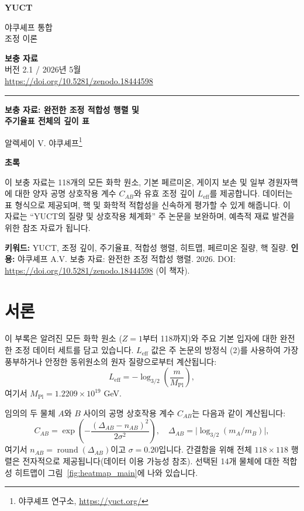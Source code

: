 \documentclass[12pt,a4paper]{article}
\newcommand{\makeheader}{%
	\noindent
	\begin{minipage}{0.17\textwidth}
		\raggedright
		{\sffamily\bfseries\color{skyblue}\fontsize{40}{40}\selectfont YUCT}%
	\end{minipage}%
	\hspace{30pt}
	\begin{minipage}{0.32\textwidth}
		\raggedright
		{\sffamily\fontsize{11}{13}\selectfont 야쿠셰프 통합\\ 조정 이론}%
	\end{minipage}%
	\hfill
	\begin{minipage}{0.38\textwidth}
		\raggedleft
		{\sffamily\bfseries 보충 자료}\\
		{\sffamily 버전 2.1 / 2026년 5월}\\
		{\sffamily\footnotesize \url{https://doi.org/10.5281/zenodo.18444598}}%
	\end{minipage}
	\par\vspace{5pt}
	\noindent\textcolor{gold}{\rule{\textwidth}{1.6pt}}
	\par\vspace{0pt}
}
\begin{document}
	\thispagestyle{firstpage}
	\makeheader
	
	\vspace{0cm}
	{\LARGE\bfseries 보충 자료: 완전한 조정 적합성 행렬 및 \\ 
		\Large 주기율표 전체의 깊이 표 \par}
	\vspace{0.2cm}
	
	{\large 알렉세이 V. 야쿠셰프\footnote{야쿠셰프 연구소, \url{https://yuct.org/}}} \\
	\vspace{0.0cm}
	
	{\color{darkblue}\textbf{\LARGE 초록}} \par
	{\large
		\noindent
		이 보충 자료는 118개의 모든 화학 원소, 기본 페르미온, 게이지 보손 및 일부 경원자핵에 대한 양자 공명 상호작용 계수 \(C_{AB}\)와 유효 조정 깊이 \(L_{\mathrm{eff}}\)를 제공합니다. 데이터는 표 형식으로 제공되며, 핵 및 화학적 적합성을 신속하게 평가할 수 있게 해줍니다. 이 자료는 ``YUCT의 질량 및 상호작용 체계화'' 주 논문을 보완하며, 예측적 재료 발견을 위한 참조 자료가 됩니다.
	}
	
	\vspace{0.1cm}
	\noindent
	{\color{darkblue}\textbf{키워드:}} YUCT, 조정 깊이, 주기율표, 적합성 행렬, 히트맵, 페르미온 질량, 핵 질량.
	\vspace{0.1cm}
	\noindent
	{\color{darkblue}\textbf{인용:}} 야쿠셰프 A.V. 보충 자료: 완전한 조정 적합성 행렬. 2026. DOI: \url{https://doi.org/10.5281/zenodo.18444598} (이 책자).
	
	\vspace{0.4cm}
	
	\noindent
	\begin{minipage}[t]{0.48\textwidth}
		\section*{서론}
		이 부록은 알려진 모든 화학 원소 (\(Z = 1\)부터 118까지)와 주요 기본 입자에 대한 완전한 조정 데이터 세트를 담고 있습니다. \(L_{\mathrm{eff}}\) 값은 주 논문의 방정식 (2)를 사용하여 가장 풍부하거나 안정한 동위원소의 원자 질량으로부터 계산됩니다:
		\[
		L_{\mathrm{eff}} = -\log_{3/2}\!\left( \frac{m}{M_{\mathrm{Pl}}} \right),
		\]
		여기서 \(M_{\mathrm{Pl}} = 1.2209\times 10^{19}\) GeV.
	\end{minipage}\hfill
	\begin{minipage}[t]{0.48\textwidth}
		임의의 두 물체 \(A\)와 \(B\) 사이의 공명 상호작용 계수 \(C_{AB}\)는 다음과 같이 계산됩니다:
		\scriptsize\[
		C_{AB} = \exp\!\left( - \frac{(\Delta_{AB} - n_{AB})^2}{2\sigma^2} \right),\quad
		\Delta_{AB} = \bigl|\log_{3/2}(m_A/m_B)\bigr|,
		\]
		여기서 \(n_{AB} = \operatorname{round}(\Delta_{AB})\)이고 \(\sigma = 0.20\)입니다.
		간결함을 위해 전체 \(118\times118\) 행렬은 전자적으로 제공됩니다(데이터 이용 가능성 참조). 선택된 14개 물체에 대한 적합성 히트맵이 그림~\ref{fig:heatmap_main}에 나와 있습니다.
	\end{minipage}
	
\end{document}
